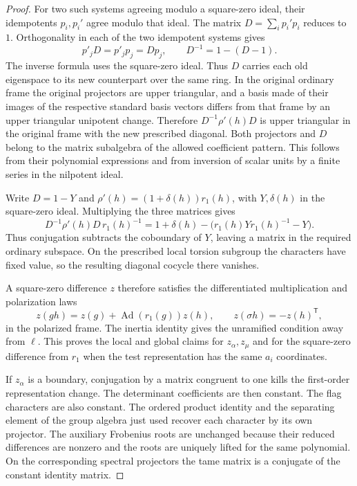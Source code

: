\begin{proof}
For two such systems agreeing modulo a square-zero
ideal, their idempotents \(p_i,p_i'\) agree modulo
that ideal. The matrix \(D=\sum_i p_i'p_i\) reduces to \(1\).
Orthogonality in each of the two idempotent systems gives
\[
       p'_jD=p'_jp_j=Dp_j,\qquad D^{-1}=1-(D-1).
\]
The inverse formula uses the square-zero ideal. Thus \(D\) carries
each old eigenspace to its new counterpart over the same ring. In the original ordinary frame the
original projectors are upper triangular, and a
basis made of their images of the respective standard
basis vectors differs from that frame by an upper
triangular unipotent change. Therefore
\(D^{-1}\rho'(h)D\) is upper triangular in the original
frame with the new prescribed diagonal. Both projectors
and \(D\) belong to the matrix subalgebra of the
allowed coefficient pattern. This follows from their
polynomial expressions and from inversion of scalar
units by a finite series in the nilpotent ideal.

Write \(D=1-Y\) and \(\rho'(h)=(1+\delta(h))r_1(h)\), with
\(Y,\delta(h)\) in the square-zero ideal. Multiplying the three
matrices gives
\[
  D^{-1}\rho'(h)D\,r_1(h)^{-1}
     =1+\delta(h)-\bigl(r_1(h)Y r_1(h)^{-1}-Y\bigr).
\]
Thus conjugation subtracts the coboundary of \(Y\), leaving a matrix in the required ordinary subspace.
On the prescribed local torsion subgroup the characters have fixed value,
so the resulting diagonal cocycle there vanishes.

A square-zero difference \(z\) therefore satisfies the differentiated multiplication and polarization laws 
\[
 z(gh)=z(g)+\operatorname{Ad}(r_1(g))z(h),\qquad z(\sigma h)=-z(h)^{\mathsf T},
\]
 in the polarized frame. The inertia identity gives the unramified
condition away from \(\ell\). This proves the local and
global claims for \(z_\alpha,z_\mu\) and for the
square-zero difference from \(r_1\) when the test
representation has the same \(a_i\) coordinates.
\label{cor:ordinary-patching-cotangent-7}

If \(z_\alpha\) is a boundary, conjugation by a matrix
congruent to one kills the first-order representation
change. The determinant coefficients are then constant.
The flag characters are also constant. The ordered product
identity and the separating element of the group algebra
just used recover each character by its own projector.
The auxiliary Frobenius roots are unchanged because
their reduced differences are nonzero and the roots
are uniquely lifted for the same polynomial. On the corresponding spectral projectors the tame matrix is a conjugate of the constant identity matrix.


\end{proof}
